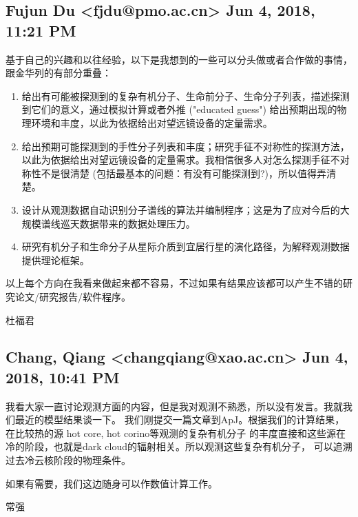 \documentclass{article}
\newcommand\from[2]{\subsection{{#1} {#2}}}
\newcommand\said[1]{#1}
\begin{document}
\from{Fujun Du <fjdu@pmo.ac.cn>}
{Jun 4, 2018, 11:21 PM}
\said{
基于自己的兴趣和以往经验，以下是我想到的一些可以分头做或者合作做的事情，跟金华列的有部分重叠：
\begin{enumerate}
  \item 给出有可能被探测到的复杂有机分子、生命前分子、生命分子列表，描述探测到它们的意义，通过模拟计算或者外推 ("educated guess") 给出预期出现的物理环境和丰度，以此为依据给出对望远镜设备的定量需求。
  \item 给出预期可能探测到的手性分子列表和丰度；研究手征不对称性的探测方法，以此为依据给出对望远镜设备的定量需求。我相信很多人对怎么探测手征不对称性不是很清楚 (包括最基本的问题：有没有可能探测到?)，所以值得弄清楚。
  \item 设计从观测数据自动识别分子谱线的算法并编制程序；这是为了应对今后的大规模谱线巡天数据带来的数据处理压力。
  \item 研究有机分子和生命分子从星际介质到宜居行星的演化路径，为解释观测数据提供理论框架。
\end{enumerate}  
以上每个方向在我看来做起来都不容易，不过如果有结果应该都可以产生不错的研究论文/研究报告/软件程序。

杜福君
}

\from{Chang, Qiang <changqiang@xao.ac.cn>}{Jun 4, 2018, 10:41 PM}
\said{
我看大家一直讨论观测方面的内容，但是我对观测不熟悉，所以没有发言。我就我们最近的模型结果谈一下。
我们刚提交一篇文章到ApJ。根据我们的计算结果，在比较热的源 hot core, hot corino等观测的复杂有机分子
的丰度直接和这些源在冷的阶段，也就是dark cloud的辐射相关。所以观测这些复杂有机分子，
可以追溯过去冷云核阶段的物理条件。

如果有需要，我们这边随身可以作数值计算工作。

常强
}
\end{document}
